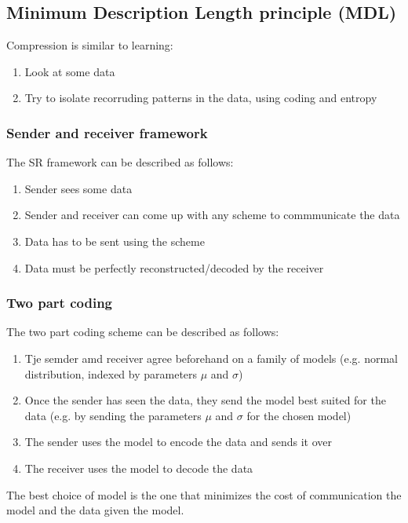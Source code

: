 \documentclass[12pt]{article}
\begin{document}
\subsection{Minimum Description Length principle (MDL)}

Compression is similar to learning: 
\begin{enumerate}[leftmargin=*, noitemsep]
    \item Look at some data 
    \item Try to isolate recorruding patterns in the data, using coding and entropy
\end{enumerate}

\subsubsection*{Sender and receiver framework}

The SR framework can be described as follows: 
\begin{enumerate}[leftmargin=*, noitemsep]
    \item Sender sees some data 
    \item Sender and receiver can come up with any scheme to commmunicate the data 
    \item Data has to be sent using the scheme 
    \item Data must be perfectly reconstructed/decoded by the receiver
\end{enumerate}

\subsubsection*{Two part coding}

The two part coding scheme can be described as follows:
\begin{enumerate}[leftmargin=*, noitemsep]
    \item Tje semder amd receiver agree beforehand on a family of models (e.g. normal distribution, indexed by parameters $\mu$ and $\sigma$)
    \item Once the sender has seen the data, they send the model best suited for the data (e.g. by sending the parameters $\mu$ and $\sigma$ for the chosen model)
    \item The sender uses the model to encode the data and sends it over 
    \item The receiver uses the model to decode the data
\end{enumerate}

The best choice of model is the one that minimizes the cost of communication the model and the data given the model.
\end{document}
